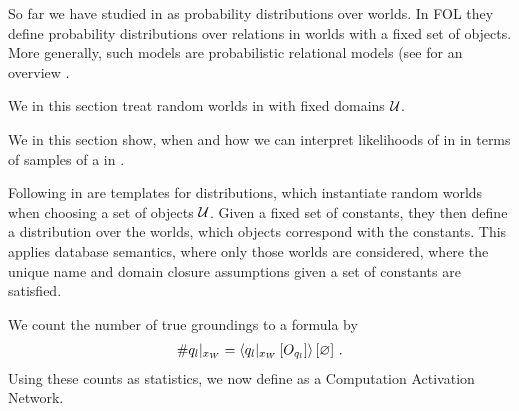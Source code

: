 



So far we have studied \MarkovLogicNetworks{} in \propositionalLogic{} as probability distributions over worlds.
In FOL they define probability distributions over relations in worlds with a fixed set of objects.
More generally, such models are probabilistic relational models (see for an overview \cite{getoor_introduction_2019}.


We in this section treat random worlds in \firstOrderLogic{} with fixed domains $\mathcal{U}$.

%
We in this section show, when and how we can interpret likelihoods of \MarkovLogicNetworks{} in \firstOrderLogic{} in terms of samples of a \MarkovLogicNetwork{} in \propositionalLogic{}.

\subsect{\HybridFOLNetworks{}}

Following \cite{richardson_markov_2006} \MarkovLogicNetworks{} in \firstOrderLogic{} are templates for distributions, which instantiate random worlds when choosing a set of objects $\mathcal{U}$.
Given a fixed set of constants, they then define a distribution over the worlds, which objects correspond with the constants. %
This applies database semantics, where only those worlds are considered, where the unique name and domain closure assumptions given a set of constants are satisfied.

We count the number of true groundings to a formula by
\begin{align*}
    \#q_{l}|_{x_{W}}
    = \left\langle {q_{l}}|_{x_{W}} \left[O_{q_{l}}\right]\right\rangle \left[ \varnothing \right] \, .
\end{align*}
Using these counts as statistics, we now define \HybridFOLNetworks{} as a Computation Activation Network.

